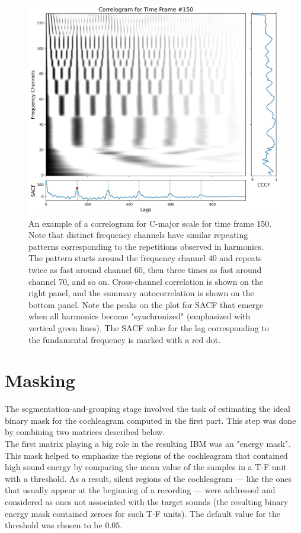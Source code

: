 \begin{figure}[t]
	\centering
	\includegraphics[width=\textwidth]{include/correlogram_example}
	\caption[An example of correlogram and the extracted features for C-major scale]{An example of a correlogram for C-major scale for time frame 150. Note that distinct frequency channels have similar repeating patterns corresponding to the repetitions observed in harmonics. The pattern starts around the frequency channel 40 and repeats twice as fast around channel 60, then three times as fast around channel 70, and so on. Cross-channel correlation is shown on the right panel, and the summary autocorrelation is shown on the bottom panel. Note the peaks on the plot for SACF that emerge when all harmonics become "synchronized" (emphasized with vertical green lines). The SACF value for the lag corresponding to the fundamental frequency is marked with a red dot.}
	\label{img:correlogram_example}
\end{figure}

\section{Masking}

The segmentation-and-grouping stage involved the task of estimating the ideal binary mask for the cochleagram computed in the first part. This step was done by combining two matrices described below.\\

The first matrix playing a big role in the resulting IBM was an "energy mask". This mask helped to emphasize the regions of the cochleagram that contained high sound energy by comparing the mean value of the samples in a T-F unit with a threshold. As a result, silent regions of the cochleagram --- like the ones that usually appear at the beginning of a recording --- were addressed and considered as ones not associated with the target sounds (the resulting binary energy mask contained zeroes for such T-F units). The default value for the threshold was chosen to be $0.05$.\pagebreak

